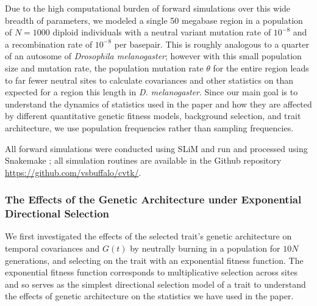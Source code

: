 \documentclass[11pt]{article}
\begin{document}
Due to the high computational burden of forward simulations over this wide
breadth of parameters, we modeled a single 50 megabase region in a population
of $N = 1000$ diploid individuals with a neutral variant mutation rate of
$10^{-8}$ and a recombination rate of $10^{-8}$ per basepair. This is roughly
analogous to a quarter of an autosome of \emph{Drosophila melanogaster};
however with this small population size and mutation rate, the population
mutation rate $\theta$ for the entire region leads to far fewer neutral sites
to calculate covariances and other statistics on than expected for a region
this length in \emph{D.  melanogaster}. Since our main goal is to understand
the dynamics of statistics used in the paper and how they are affected by
different quantitative genetic fitness models, background selection, and trait
architecture, we use population frequencies rather than sampling frequencies. 

All forward simulations were conducted using SLiM \parencite{Haller2019-vu} and
run and processed using Snakemake \parencite{Koster2012-iv}; all simulation
routines are available in the Github repository
\url{https://github.com/vsbuffalo/cvtk/}.

\subsubsection{The Effects of the Genetic Architecture under Exponential Directional Selection}
\label{supp:genetic-arch}

We first investigated the effects of the selected trait's genetic architecture
on temporal covariances and $G(t)$ by neutrally burning in a population for
$10N$ generations, and selecting on the trait with an exponential fitness
function. The exponential fitness function corresponds to multiplicative
selection across sites and so serves as the simplest directional selection
model of a trait to understand the effects of genetic architecture on the
statistics we have used in the paper.
\end{document}
